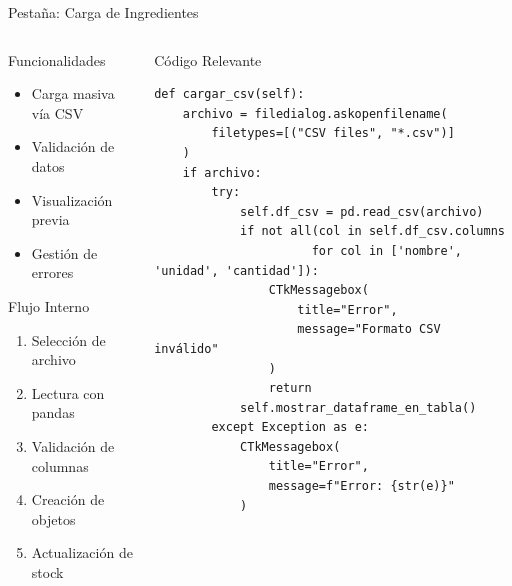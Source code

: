 \documentclass[12pt]{beamer}
\begin{document}
\begin{frame}[fragile]{Pestaña: Carga de Ingredientes}
  \begin{columns}[t]
    \begin{column}{0.4\textwidth}
      \begin{block}{Funcionalidades}
        \begin{itemize}[<+->]
          \item Carga masiva vía CSV
          \item Validación de datos
          \item Visualización previa
          \item Gestión de errores
        \end{itemize}
      \end{block}
      
      \begin{alertblock}{Flujo Interno}
        \begin{enumerate}[<+->]
          \item Selección de archivo
          \item Lectura con pandas
          \item Validación de columnas
          \item Creación de objetos
          \item Actualización de stock
        \end{enumerate}
      \end{alertblock}
    \end{column}
    
    \begin{column}{0.6\textwidth}
      \begin{exampleblock}{Código Relevante}
        \begin{lstlisting}[style=mystyle]
def cargar_csv(self):
    archivo = filedialog.askopenfilename(
        filetypes=[("CSV files", "*.csv")]
    )
    if archivo:
        try:
            self.df_csv = pd.read_csv(archivo)
            if not all(col in self.df_csv.columns 
                      for col in ['nombre', 'unidad', 'cantidad']):
                CTkMessagebox(
                    title="Error",
                    message="Formato CSV inválido"
                )
                return
            self.mostrar_dataframe_en_tabla()
        except Exception as e:
            CTkMessagebox(
                title="Error",
                message=f"Error: {str(e)}"
            )
        \end{lstlisting}
      \end{exampleblock}
    \end{column}
  \end{columns}
\end{frame}
\end{document}
